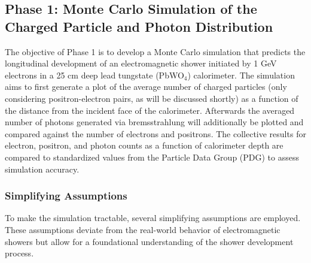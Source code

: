 \documentclass[twocolumn]{aastex631}
\begin{document}
\subsection{Phase 1: Monte Carlo Simulation of the Charged Particle and Photon
Distribution} 

The objective of Phase 1 is to develop a Monte Carlo simulation that predicts
the longitudinal development of an electromagnetic shower initiated by 1 GeV
electrons in a 25 cm deep lead tungstate (PbWO$_\text{4}$) calorimeter. The simulation aims to
first generate a plot of the average number of charged particles (only
considering positron-electron pairs, as will be discussed shortly) as a function
of the distance from the incident face of the calorimeter. Afterwards the
averaged number
of photons generated via bremsstrahlung will additionally be plotted and compared
against the number of electrons and positrons. The collective results for
electron, positron, and photon counts as a function of calorimeter depth are
compared to standardized values from the Particle Data Group (PDG) to assess
simulation accuracy. 

\subsubsection{Simplifying Assumptions} 

To make the simulation tractable, several simplifying assumptions are employed.
These assumptions deviate from the real-world behavior of electromagnetic
showers but allow for a foundational understanding of the shower development
process. 
\end{document}
